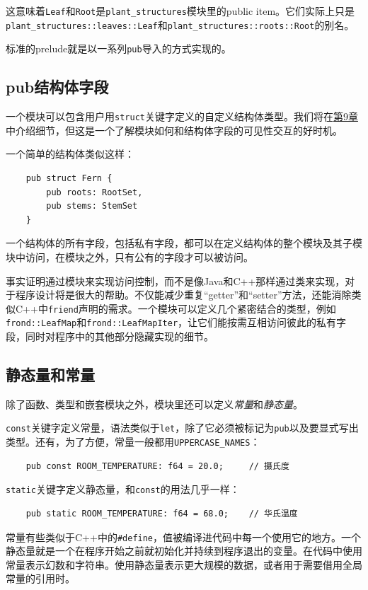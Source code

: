 这意味着\texttt{Leaf}和\texttt{Root}是\texttt{plant\_structures}模块里的public item。它们实际上只是\texttt{plant\_structures::leaves::Leaf}和\texttt{plant\_structures::roots::Root}的别名。

标准的prelude就是以一系列\texttt{pub}导入的方式实现的。

\subsection{pub结构体字段}
一个模块可以包含用户用\texttt{struct}关键字定义的自定义结构体类型。我们将在\hyperref[ch09]{第9章}中介绍细节，但这是一个了解模块如何和结构体字段的可见性交互的好时机。

一个简单的结构体类似这样：
\begin{verbatim}
    pub struct Fern {
        pub roots: RootSet,
        pub stems: StemSet
    }
\end{verbatim}

一个结构体的所有字段，包括私有字段，都可以在定义结构体的整个模块及其子模块中访问，在模块之外，只有公有的字段才可以被访问。

事实证明通过模块来实现访问控制，而不是像Java和C++那样通过类来实现，对于程序设计将是很大的帮助。不仅能减少重复“getter”和“setter”方法，还能消除类似C++中\texttt{friend}声明的需求。一个模块可以定义几个紧密结合的类型，例如\texttt{frond::LeafMap}和\texttt{frond::LeafMapIter}，让它们能按需互相访问彼此的私有字段，同时对程序中的其他部分隐藏实现的细节。

\subsection{静态量和常量}

除了函数、类型和嵌套模块之外，模块里还可以定义\emph{常量}和\emph{静态量}。

\texttt{const}关键字定义常量，语法类似于\texttt{let}，除了它必须被标记为\texttt{pub}以及要显式写出类型。还有，为了方便，常量一般都用\texttt{UPPERCASE\_NAMES}：
\begin{verbatim}
    pub const ROOM_TEMPERATURE: f64 = 20.0;     // 摄氏度
\end{verbatim}

\texttt{static}关键字定义静态量，和\texttt{const}的用法几乎一样：
\begin{verbatim}
    pub static ROOM_TEMPERATURE: f64 = 68.0;    // 华氏温度
\end{verbatim}

常量有些类似于C++中的\texttt{\#define}，值被编译进代码中每一个使用它的地方。一个静态量就是一个在程序开始之前就初始化并持续到程序退出的变量。在代码中使用常量表示幻数和字符串。使用静态量表示更大规模的数据，或者用于需要借用全局常量的引用时。

